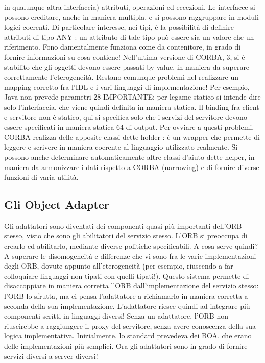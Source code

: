 in qualunque altra interfaccia) attributi, operazioni ed eccezioni. Le interfacce
si possono ereditare, anche in maniera multipla, e si possono raggruppare in
moduli logici coerenti.
Di particolare interesse, nei tipi, è la possibilità di definire attributi di tipo
ANY : un attributo di tale tipo può essere sia un valore che un riferimento. Fono
damentalmente funziona come da contenitore, in grado di fornire informazioni
su cosa contiene! Nell'ultima versione di CORBA, 3, si è stabilito che gli
oggetti devono essere passati by-value, in maniera da superare correttamente
l'eterogeneità.
Restano comunque problemi nel realizzare un mapping corretto fra l'IDL e
i vari linguaggi di implementazione! Per esempio, Java non prevede parametri
28 IMPORTANTE: per legame statico si intende dire solo l'interfaccia, che viene quindi
definita in maniera statica. Il binding fra client e servitore non è statico, qui si specifica solo
che i servizi del servitore devono essere specificati in maniera statica
64
di output. Per ovviare a questi problemi, CORBA realizza delle apposite classi dette holder : è un wrapper che permette
di leggere e scrivere in maniera
coerente al linguaggio utilizzato realmente. Si possono anche determinare automaticamente altre classi d'aiuto dette
helper, in maniera da armonizzare i dati
rispetto a CORBA (narrowing) e di fornire diverse funzioni di varia utilità.
\subsection{Gli Object Adapter}
Gli adattatori sono diventati dei componenti quasi più importanti dell'ORB
stesso, visto che sono gli abilitatori del servizio stesso. L'ORB si preoccupa di
crearlo ed abilitarlo, mediante diverse politiche specificabili.
A cosa serve quindi? A superare le disomogeneità e differenze che vi sono
fra le varie implementazioni degli ORB, dovute appunto all'eterogeneità (per
esempio, riuscendo a far colloquiare linguaggi non tipati con quelli tipati!).
Questo sistema permette di disaccoppiare in maniera corretta l'ORB dall'implementazione del servizio stesso: l'ORB lo
sfrutta, ma ci pensa l'adattatore a
richiamarlo in maniera corretta a seconda della sua implementazione. L'adattatore riesce quindi ad integrare più
componenti scritti in linguaggi diversi! Senza
un adattatore, l'ORB non riuscirebbe a raggiungere il proxy del servitore, senza
avere conoscenza della sua logica implementativa.
Inizialmente, lo standard prevedeva dei BOA, che erano delle implementazioni più semplici. Ora gli adattatori sono in
grado di fornire servizi diversi a
server diversi!
